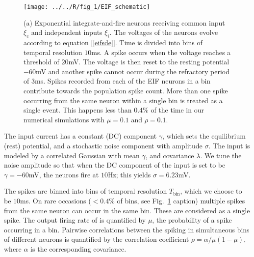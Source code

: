 \documentclass[%
 reprint,
 twocolumn,
 amsmath,amssymb,
 aps,
floatfix,
]{revtex4}
\begin{document}
\begin{figure}[t!]
\texttt{[image: ../../R/fig\_1/EIF\_schematic]}
\caption{\label{fig:schematic} (a) Exponential integrate-and-fire neurons receiving common input $\xi_c$ and independent inputs $\xi_i$. The voltages of the neurons evolve according to equation [\ref{eifsde}]. Time is divided into bins of temporal resolution $10$ms. A spike occurs when the voltage reaches a threshold of $20$mV. The voltage is then reset to the resting potential $-60$mV and another spike cannot occur during the refractory period of $3$ms. Spikes recorded from each of the EIF neurons in a bin contribute towards the population spike count.  More than one spike occurring from the same neuron within a single bin is treated as a single event. This happens less than $0.4\%$ of the time in our numerical simulations with $\mu=0.1$ and $\rho=0.1$.}
\end{figure}

The input current has a constant (DC) component $\gamma$, which sets the equilibrium (rest) potential, and a stochastic noise component with amplitude $\sigma$. The input is modeled by a correlated Gaussian with mean $\gamma$, and covariance $\lambda$.  We tune the noise amplitude so that when the DC component of the input is set to be $\gamma = -60$mV, the neurons fire at $10$Hz; this yields $\sigma = 6.23$mV.

The spikes are binned into bins of temporal resolution $T_\text{bin}$, which we choose to be $10$ms. On rare occasions ($<0.4\%$ of bins, see Fig.~\ref{fig:schematic} caption) multiple spikes from the same neuron can occur in the same bin. These are considered as a single spike.  The output firing rate of is quantified by $\mu$, the probability of a spike occurring in a bin.  Pairwise correlations between the spiking in simultaneous bins of different neurons is quantified by the correlation coefficient $\rho=\alpha/\mu(1-\mu)$, where $\alpha$ is the corresponding covariance.




\end{document}
